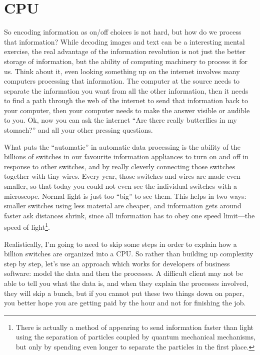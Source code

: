 \documentclass[12pt]{amsbook}
\begin{document}
{\section{CPU}
%
So encoding information as on/off choices is not hard,
but how do we process that information?
While decoding images and text can be a interesting mental exercise,
the real advantage of the information revolution is not just the better storage of information,
but the ability of computing machinery to process it for us.
Think about it, even looking something up on the internet involves many computers processing that information.
The computer at the source needs to separate the information you want from all the other information,
then it needs to find a path through the web of the internet to send that information back to your computer,
then your computer needs to make the answer visible or audible to you.
Ok, now you can ask the internet ``Are there really butterflies in my stomach?''  and all your other pressing questions.

\medskip
What puts the ``automatic'' in automatic data processing is the ability of the billions of switches in our favourite information appliances to turn on and off in response to other switches,
and by really cleverly connecting those switches together with tiny wires.
Every year, those switches and wires are made even smaller,
so that today you could not even see the individual switches with a microscope.  
Normal light is just too ``big'' to see them.
This helps in two ways:
smaller switches using less material are cheaper,
and information gets around faster ask distances shrink,
since all information has to obey one speed limit---the speed of light\footnote{There is actually a method of appearing to send information faster than light using the separation of particles coupled by quantum mechanical mechanisms,
but only by spending even longer to separate the particles in the first place.}. 

Realistically, I'm going to need to skip some steps in order to explain how a billion switches are organized into a CPU.
So rather than building up complexity step by step,
let's use an approach which works for developers of business software: model the data and then the processes.
A difficult client may not be able to tell you what the data is,
and when they explain the processes involved, 
they will skip a bunch,
but if you cannot put these two things down on paper, 
you better hope you are getting paid by the hour and not for finishing the job.

}
\end{document}
